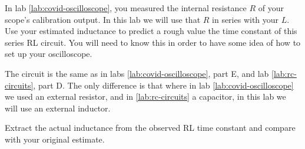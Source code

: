 In lab \ref{lab:covid-oscilloscope}, you measured the internal resistance $R$
of your scope's calibration output. In this lab we will use that $R$ in series
with your $L$. Use your estimated inductance to predict a rough value
the time constant of this series RL circuit. You will need to know this in
order to have some idea of how to set up your oscilloscope.

\observations

The circuit is the same as in labs \ref{lab:covid-oscilloscope}, part E, and
lab \ref{lab:rc-circuits}, part D. The only difference is that where in lab
\ref{lab:covid-oscilloscope} we used an external resistor, and in \ref{lab:rc-circuits}
a capacitor, in this lab we will use an external inductor.

\analysis

Extract the actual inductance from the observed RL time constant and compare with
your original estimate.

